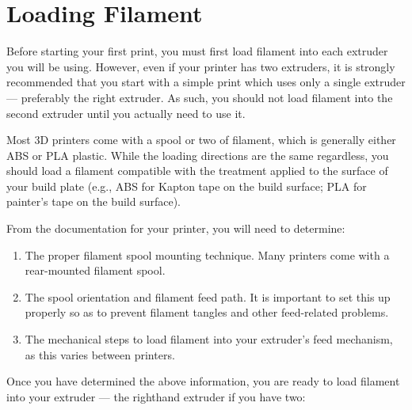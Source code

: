 \section{Loading Filament}

Before starting your first print, you must first load filament into each extruder you will be using.  However, even if your printer has two extruders, it is strongly recommended that you start with a simple print which uses only a single extruder --- preferably the right extruder.  As such, you should not load filament into the second extruder until you actually need to use it.

Most 3D printers come with a spool or two of filament, which is generally either ABS or PLA plastic.  While the loading directions are the same regardless, you should load a filament compatible with the treatment applied to the surface of your build plate (e.g., ABS for Kapton tape on the build surface; PLA for painter's tape on the build surface).

From the documentation for your printer, you will need to determine:

\begin{enumerate}
\item The proper filament spool mounting technique.  Many printers come with a rear-mounted filament spool.
\item The spool orientation and filament feed path.  It is important to set this up properly so as to prevent filament tangles and other feed-related problems.
\item The mechanical steps to load filament into your extruder's feed mechanism, as this varies between printers.
\end{enumerate}

Once you have determined the above information, you are ready to load filament into your extruder --- the righthand extruder if you have two:


